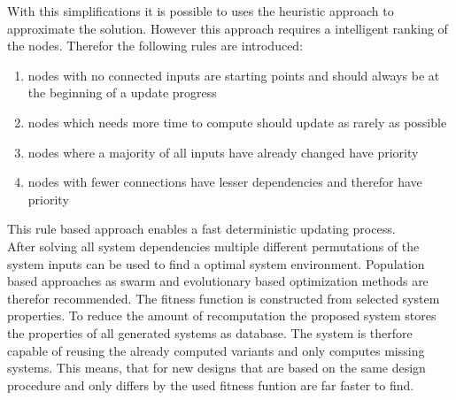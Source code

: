 With this simplifications it is possible to uses the heuristic approach to approximate the solution.
However this approach requires a intelligent ranking of the nodes.
Therefor the following rules are introduced:
\begin{enumerate}
    \item nodes with no connected inputs are starting points and should always be at the beginning of a update progress
    \item nodes which needs more time to compute should update as rarely as possible
    \item nodes where a majority of all inputs have already changed have priority
    \item nodes with fewer connections have lesser dependencies and therefor have priority
\end{enumerate}
This rule based approach enables a fast deterministic updating process.\\
After solving all system dependencies multiple different permutations of the system inputs can be used to find a optimal system environment.
Population based approaches as swarm and evolutionary based optimization methods are therefor recommended.
The fitness function is constructed from selected system properties.
To reduce the amount of recomputation the proposed system stores the properties of all generated systems as database.
The system is therfore capable of reusing the already computed variants and only computes missing systems.
This means, that for new designs that are based on the same design procedure and only differs by the used fitness funtion are far faster to find.